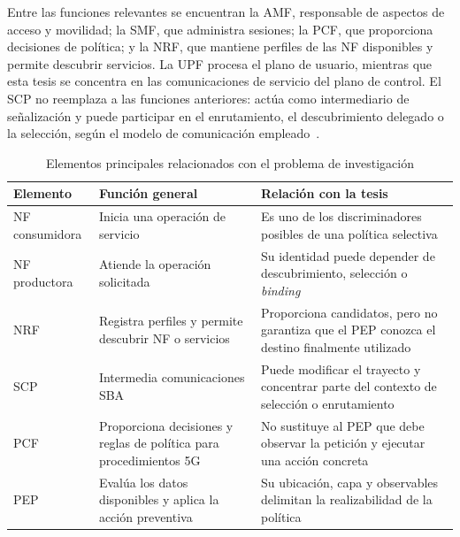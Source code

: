 Entre las funciones relevantes se encuentran la AMF, responsable de aspectos de acceso y movilidad; la SMF, que administra sesiones; la PCF, que proporciona decisiones de política; y la NRF, que mantiene perfiles de las NF disponibles y permite descubrir servicios. La UPF procesa el plano de usuario, mientras que esta tesis se concentra en las comunicaciones de servicio del plano de control. El SCP no reemplaza a las funciones anteriores: actúa como intermediario de señalización y puede participar en el enrutamiento, el descubrimiento delegado o la selección, según el modelo de comunicación empleado~\cite{ETSI_TS_123501_R16}.

\begin{table}[H]
    \centering
    \caption{Elementos principales relacionados con el problema de investigación}
    \label{tab:elementos-fundamentales}
    \small
    \begin{singlespace}
    \begin{tabularx}{\textwidth}{@{}
        >{\raggedright\arraybackslash}p{2.0cm}
        >{\raggedright\arraybackslash}p{4.2cm}
        >{\raggedright\arraybackslash}X@{}}
        \toprule
        Elemento & Función general & Relación con la tesis \\
        \midrule
        NF consumidora & Inicia una operación de servicio & Es uno de los discriminadores posibles de una política selectiva \\
        NF productora & Atiende la operación solicitada & Su identidad puede depender de descubrimiento, selección o \textit{binding} \\
        NRF & Registra perfiles y permite descubrir NF o servicios & Proporciona candidatos, pero no garantiza que el PEP conozca el destino finalmente utilizado \\
        SCP & Intermedia comunicaciones SBA & Puede modificar el trayecto y concentrar parte del contexto de selección o enrutamiento \\
        PCF & Proporciona decisiones y reglas de política para procedimientos 5G & No sustituye al PEP que debe observar la petición y ejecutar una acción concreta \\
        PEP & Evalúa los datos disponibles y aplica la acción preventiva & Su ubicación, capa y observables delimitan la realizabilidad de la política \\
        \bottomrule
    \end{tabularx}
    \end{singlespace}
\end{table}


